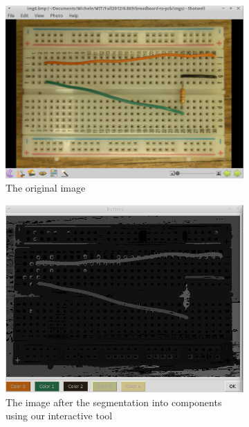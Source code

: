 \documentclass[10pt,twocolumn,letterpaper]{article}
\begin{document}
\begin{figure}[ht]
\centering
\begin{subfigure}[b]{\linewidth}
	\centering
   \includegraphics[width=0.9\linewidth]{demos/full_pipeline2_original.png}
	\caption{The original image}
	\label{fig:origfull}
\end{subfigure}
\begin{subfigure}[b]{\linewidth}
	\centering
   \includegraphics[width=0.9\linewidth]{demos/full_pipeline2_segmentation.png}
	\caption{The image after the segmentation into components using
      our interactive tool}
	\label{fig:segfull}
\end{subfigure}
\begin{subfigure}[b]{\linewidth}
	\centering

\end{subfigure}
\end{figure}
\end{document}
